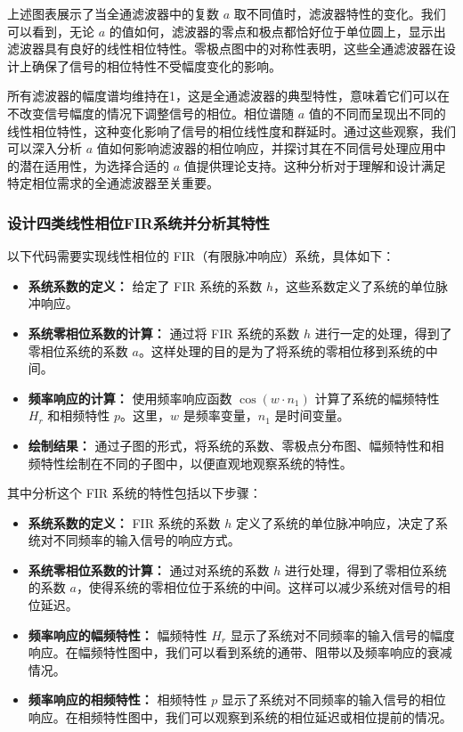 \documentclass[a4paper,12pt]{article}
\begin{document}
上述图表展示了当全通滤波器中的复数 \( a \) 取不同值时，滤波器特性的变化。我们可以看到，无论 \( a \) 的值如何，滤波器的零点和极点都恰好位于单位圆上，显示出滤波器具有良好的线性相位特性。零极点图中的对称性表明，这些全通滤波器在设计上确保了信号的相位特性不受幅度变化的影响。

所有滤波器的幅度谱均维持在1，这是全通滤波器的典型特性，意味着它们可以在不改变信号幅度的情况下调整信号的相位。相位谱随 \( a \) 值的不同而呈现出不同的线性相位特性，这种变化影响了信号的相位线性度和群延时。通过这些观察，我们可以深入分析 \( a \) 值如何影响滤波器的相位响应，并探讨其在不同信号处理应用中的潜在适用性，为选择合适的 \( a \) 值提供理论支持。这种分析对于理解和设计满足特定相位需求的全通滤波器至关重要。

\subsubsection{设计四类线性相位FIR系统并分析其特性}
以下代码需要实现线性相位的 FIR（有限脉冲响应）系统，具体如下：

\begin{itemize}
    \item \textbf{系统系数的定义：} 给定了 FIR 系统的系数 \( h \)，这些系数定义了系统的单位脉冲响应。
    
    \item \textbf{系统零相位系数的计算：} 通过将 FIR 系统的系数 \( h \) 进行一定的处理，得到了零相位系统的系数 \( a \)。这样处理的目的是为了将系统的零相位移到系统的中间。
    
    \item \textbf{频率响应的计算：} 使用频率响应函数 \( \cos(w \cdot n_1) \) 计算了系统的幅频特性 \( H_r \) 和相频特性 \( p \)。这里，\( w \) 是频率变量，\( n_1 \) 是时间变量。
    
    \item \textbf{绘制结果：} 通过子图的形式，将系统的系数、零极点分布图、幅频特性和相频特性绘制在不同的子图中，以便直观地观察系统的特性。
\end{itemize}

其中分析这个 FIR 系统的特性包括以下步骤：

\begin{itemize}
    \item \textbf{系统系数的定义：} FIR 系统的系数 \( h \) 定义了系统的单位脉冲响应，决定了系统对不同频率的输入信号的响应方式。
    
    \item \textbf{系统零相位系数的计算：} 通过对系统的系数 \( h \) 进行处理，得到了零相位系统的系数 \( a \)，使得系统的零相位位于系统的中间。这样可以减少系统对信号的相位延迟。
    
    \item \textbf{频率响应的幅频特性：} 幅频特性 \( H_r \) 显示了系统对不同频率的输入信号的幅度响应。在幅频特性图中，我们可以看到系统的通带、阻带以及频率响应的衰减情况。
    
    \item \textbf{频率响应的相频特性：} 相频特性 \( p \) 显示了系统对不同频率的输入信号的相位响应。在相频特性图中，我们可以观察到系统的相位延迟或相位提前的情况。
\end{itemize}
\end{document}

